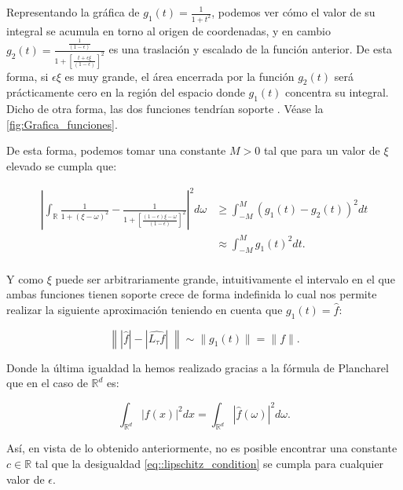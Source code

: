 \begin{observacion}
  \noindent Representando la gráfica de $g_1(t)= \frac{1}{1+t^2}$, podemos ver cómo el valor de su integral se acumula en torno al origen de coordenadas, y en cambio $g_2(t)=\frac{\frac{1}{(1-\epsilon)}}{1+\left[ \frac{t+\epsilon\xi}{(1-\epsilon)}\right]^2}$ es una traslación y escalado de la función anterior. De esta forma, si $\epsilon\xi$ es muy grande, el área encerrada por la función $g_2(t)$ será prácticamente cero en la región del espacio donde $g_1(t)$ concentra su integral. Dicho de otra forma, las dos funciones tendrían soporte . Véase la \autoref{fig:Grafica_funciones}.

  \noindent De esta forma, podemos tomar una constante $M>0$ tal que para un valor de $\xi$ elevado se cumpla que: 

  \begin{align*}
    \left| \int_{\mathbb{R}}\frac{1}{1+(\xi - \omega)^2} - \frac{1}{1+\left[ \frac{(1-\epsilon) \xi - \omega}{(1-\epsilon)}\right]^2} \right|^2 d\omega 
    &\geq \int_{-M}^{M} (g_1(t)-g_2(t))^2 dt \\
    &\approx \int_{-M}^{M} g_1(t)^2 dt. \\
  \end{align*}

  \noindent Y como $\xi$ puede ser arbitrariamente grande, intuitivamente el intervalo en el que ambas funciones tienen soporte  crece de forma indefinida lo cual nos permite realizar la siguiente aproximación teniendo en cuenta que $g_1(t)=\widehat{f}$:

  \begin{equation} \label{eq::1.1}
    \left\| |\widehat{f}| -|\widehat{L_\tau f}| \; \right\| \sim \|g_1(t) \|=\|f\|. 
  \end{equation}

  \noindent Donde la última igualdad la hemos realizado gracias a la fórmula de Plancharel que en el caso de $\mathbb{R}^d$ es: 

  \begin{equation} \label{eq::Plancharel}
    \int_{\mathbb{R}^d} \left|f(x)\right|^2 dx= \int_{\mathbb{R}^d}\left|\widehat{f}(\omega)\right|^2 d\omega.
  \end{equation}

  \noindent Así, en vista de lo obtenido anteriormente, no es posible encontrar una constante $c \in \mathbb{R}$ tal que la desigualdad \eqref{eq::lipschitz_condition} se cumpla para cualquier valor de $\epsilon$.


\end{observacion}
